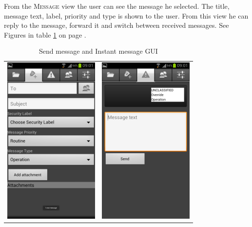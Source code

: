 From the \textsc{Message} view the user can see the message he selected. The title, message text, label, priority and type is shown to the user. From this view he can reply to the message, forward it and switch between received messages. See Figures in table \ref{tab:sendinstantmessage} on page \pageref{tab:sendinstantmessage}.
\newline
\begin{table}[h!]
\begin{center}
\begin{tabular}{cc}
\includegraphics{sendmessage} & \includegraphics{instamessage}
\end{tabular}
\caption{Send message and Instant message GUI} \label{tab:sendinstantmessage}
\end{center}
\end{table}

